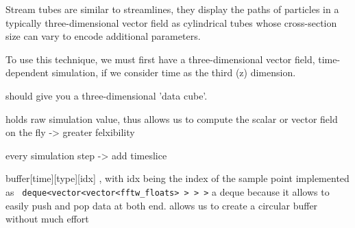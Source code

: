 
 Stream tubes are similar to streamlines, they display the paths of particles in a typically three-dimensional vector field as cylindrical tubes whose cross-section size can vary to encode additional parameters.
 
 To use this technique, we must first have a three-dimensional vector field,
 time-dependent simulation, if we consider time as the third (z) dimension. 
 
 should give you a three-dimensional 'data cube'. 
 
 holds raw simulation value, thus allows us to compute the scalar or vector field on the fly -> greater felxibility
 
 every simulation step -> add timeslice
 
 buffer[time][type][idx] , with idx being the index of the sample point implemented as 
\verb| deque<vector<vector<fftw_floats> > > >|
a deque  because it allows to easily push and pop data at both end. 
allows us to create a circular buffer without much effort
   
  
  
  
 
 
 
 
 
